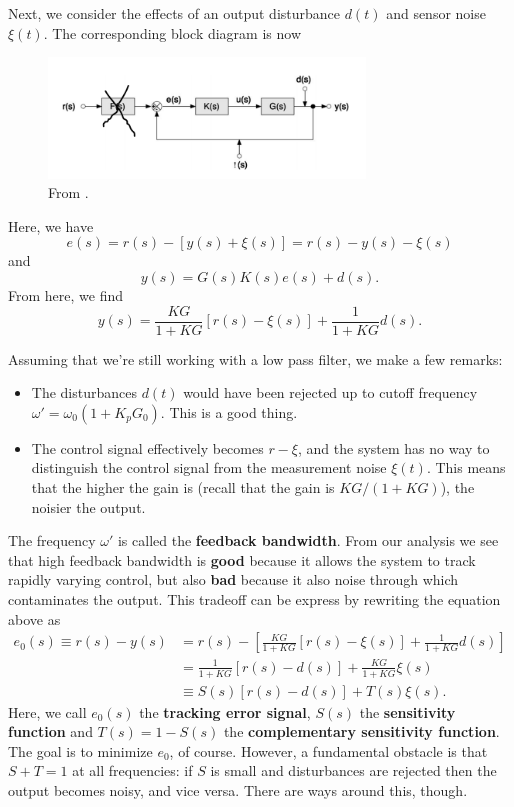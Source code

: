 \documentclass{book}
\theoremstyle{definition}
\newcommand{\f}[2]{\frac{#1}{#2}}
\newcommand{\lb}{\left[}
\newcommand{\rb}{\right]}
\begin{document}
Next, we consider the effects of an output disturbance $d(t)$ and sensor noise $\xi(t)$. The corresponding block diagram is now
\begin{figure}[!htb]
	\centering
	\includegraphics[width=0.75\textwidth]{images/block-3}
	\caption{From \cite{bechhoefer2005feedback}.}
\end{figure}
Here, we have
\begin{equation*}
e(s) = r(s) - [y(s) + \xi(s)] = r(s) - y(s) - \xi(s) 
\end{equation*}
and
\begin{equation*}
y(s) = G(s) K(s) e(s) + d(s).
\end{equation*}
From here, we find 
\begin{equation*}
y(s) = \f{KG}{1+KG}[r(s) - \xi(s)] + \f{1}{1+ KG}d(s). 
\end{equation*}

Assuming that we're still working with a low pass filter, we make a few remarks:
\begin{itemize}
	\item The disturbances $d(t)$ would have been rejected up to cutoff frequency $\omega' = \omega_0(1+ K_p G_0)$. This is a good thing. 
	
	\item The control signal effectively becomes $r-\xi$, and the system has no way to distinguish the control signal from the measurement noise $\xi(t)$. This means that the higher the gain is (recall that the gain is $KG/(1+KG)$), the noisier the output. 
\end{itemize}


The frequency $\omega'$ is called the \textbf{feedback bandwidth}. From our analysis we see that high feedback bandwidth is \textbf{good} because it allows the system to track rapidly varying control, but also \textbf{bad} because it also noise through which contaminates the output. This tradeoff can be express by rewriting the equation above as 
\begin{align*}
e_0(s) \equiv r(s) - y(s) &= r(s) - \lb \f{KG}{1+KG}[r(s) - \xi(s)] + \f{1}{1+ KG}d(s)  \rb \\
&= \f{1}{1+KG}[r(s) - d(s)] + \f{KG}{1+KG}\xi(s) \\
&\equiv S(s)[r(s) - d(s)] + T(s) \xi(s). 
\end{align*}
Here, we call $e_0(s)$ the \textbf{tracking error signal}, $S(s)$ the \textbf{sensitivity function} and $T(s) = 1- S(s)$ the \textbf{complementary sensitivity function}. The goal is to minimize $e_0$, of course. However, a fundamental obstacle is that $S+T = 1$ at all frequencies: if $S$ is small and disturbances are rejected then the output becomes noisy, and vice versa. There are ways around this, though. 
\end{document}
